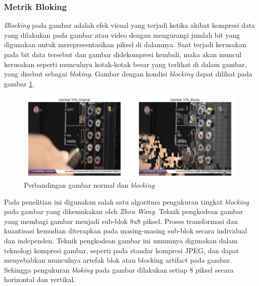 \subsubsection{Metrik Bloking}
\hspace{1,2cm}
\textit{Blocking} pada gambar adalah efek visual yang terjadi ketika akibat kompresi data yang dilakukan pada gambar atau video dengan mengurangi jumlah bit yang digunakan untuk merepresentasikan piksel di dalamnya. Saat terjadi kerusakan pada bit data tersebut dan gambar didekompresi kembali, maka akan muncul kerusakan seperti  munculnya kotak-kotak besar yang terlihat di dalam gambar, yang disebut sebagai \textit{bloking}. Gambar dengan kondisi \textit{blocking} dapat dilihat pada gambar \ref{gambar-blocking}.

\begin{figure}[H]
	\vspace{-0.1cm}
	\begin{center}
		\includegraphics[width=1\columnwidth]{bab3/Gambar/gambar-blocking.png}
	\end{center}
	\vspace{-0.2cm}
	\caption{Perbandingan gambar normal dan \textit{blocking}} \label{gambar-blocking}
\end{figure}


Pada penelitian ini digunakan salah satu algoritma pengukuran tingkat \textit{blocking} pada gambar yang dikemukakan oleh \textit{Zhou Wang}. Teknik pengkodean gambar yang membagi gambar menjadi sub-blok 8x8 piksel. Proses transformasi dan kuantisasi kemudian diterapkan pada masing-masing sub-blok secara individual dan independen. Teknik pengkodean gambar ini umumnya digunakan dalam teknologi kompresi gambar, seperti pada standar kompresi JPEG, dan dapat menyebabkan munculnya artefak blok atau blocking artifact pada gambar. Sehingga pengukuran \textit{bloking} pada gambar dilakukan setiap 8 piksel secara horizontal dan vertikal.

